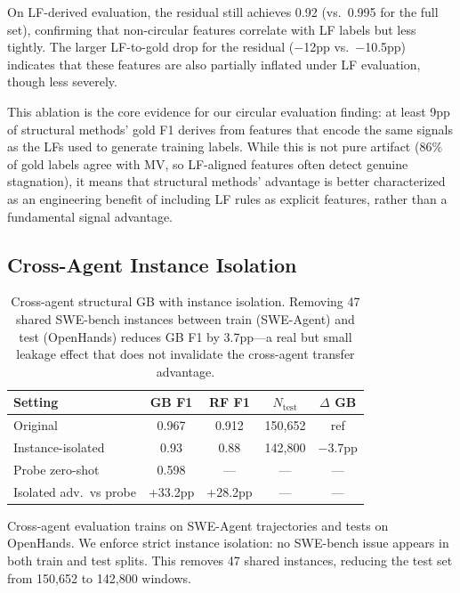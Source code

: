\documentclass[11pt,a4paper]{article}
\begin{document}
On LF-derived evaluation, the residual still achieves 0.92 (vs.\ 0.995 for the full set), confirming that non-circular features correlate with LF labels but less tightly.
The larger LF-to-gold drop for the residual ($-$12pp vs.\ $-$10.5pp) indicates that these features are also partially inflated under LF evaluation, though less severely.

This ablation is the core evidence for our circular evaluation finding: at least 9pp of structural methods' gold F1 derives from features that encode the same signals as the LFs used to generate training labels.
While this is not pure artifact (86\% of gold labels agree with MV, so LF-aligned features often detect genuine stagnation), it means that structural methods' advantage is better characterized as an engineering benefit of including LF rules as explicit features, rather than a fundamental signal advantage.

\subsection{Cross-Agent Instance Isolation}
\label{sec:cross-agent}

\begin{table}[t]
\centering
\small
\begin{tabular}{lcccc}
\toprule
\textbf{Setting} & \textbf{GB F1} & \textbf{RF F1} & \textbf{$N_\text{test}$} & \textbf{$\Delta$ GB} \\
\midrule
Original & 0.967 & 0.912 & 150,652 & ref \\
Instance-isolated & 0.93 & 0.88 & 142,800 & $-$3.7pp \\
\midrule
Probe zero-shot & 0.598 & --- & --- & --- \\
Isolated adv.\ vs probe & +33.2pp & +28.2pp & --- & --- \\
\bottomrule
\end{tabular}
\caption{Cross-agent structural GB with instance isolation. Removing 47 shared SWE-bench instances between train (SWE-Agent) and test (OpenHands) reduces GB F1 by 3.7pp---a real but small leakage effect that does not invalidate the cross-agent transfer advantage.}
\label{tab:instance-isolation}
\end{table}

Cross-agent evaluation trains on SWE-Agent trajectories and tests on OpenHands.
We enforce strict instance isolation: no SWE-bench issue appears in both train and test splits.
This removes 47 shared instances, reducing the test set from 150,652 to 142,800 windows.
\end{document}

